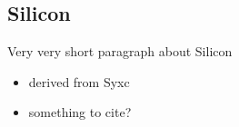 
\subsection{Silicon}\label{sct:silicon}
\begin{sketch}
Very very short paragraph about Silicon
\begin{itemize}
\item derived from Syxc
\item something to cite?
\end{itemize}
\end{sketch}